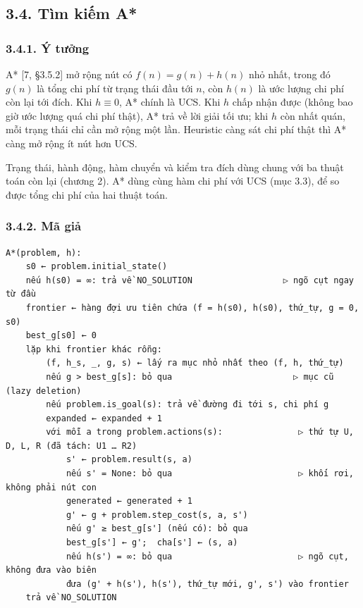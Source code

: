 \subsection{3.4. Tìm kiếm A*}

\subsubsection{3.4.1. Ý tưởng}

A* {[}7, §3.5.2{]} mở rộng nút có \(f(n) = g(n) + h(n)\) nhỏ nhất, trong đó \(g(n)\) là tổng chi phí từ trạng thái đầu tới \(n\), còn \(h(n)\) là ước lượng chi phí còn lại tới đích. Khi \(h \equiv 0\), A* chính là UCS. Khi \(h\) chấp nhận được (không bao giờ ước lượng quá chi phí thật), A* trả về lời giải tối ưu; khi \(h\) còn nhất quán, mỗi trạng thái chỉ cần mở rộng một lần. Heuristic càng sát chi phí thật thì A* càng mở rộng ít nút hơn UCS.

Trạng thái, hành động, hàm chuyển và kiểm tra đích dùng chung với ba thuật toán còn lại (chương 2). A* dùng cùng hàm chi phí với UCS (mục 3.3), để so được tổng chi phí của hai thuật toán.

\subsubsection{3.4.2. Mã giả}

\begin{verbatim}
A*(problem, h):
    s0 ← problem.initial_state()
    nếu h(s0) = ∞: trả về NO_SOLUTION                  ▷ ngõ cụt ngay từ đầu
    frontier ← hàng đợi ưu tiên chứa (f = h(s0), h(s0), thứ_tự, g = 0, s0)
    best_g[s0] ← 0
    lặp khi frontier khác rỗng:
        (f, h_s, _, g, s) ← lấy ra mục nhỏ nhất theo (f, h, thứ_tự)
        nếu g > best_g[s]: bỏ qua                        ▷ mục cũ (lazy deletion)
        nếu problem.is_goal(s): trả về đường đi tới s, chi phí g
        expanded ← expanded + 1
        với mỗi a trong problem.actions(s):               ▷ thứ tự U, D, L, R (đã tách: U1 … R2)
            s' ← problem.result(s, a)
            nếu s' = None: bỏ qua                         ▷ khối rơi, không phải nút con
            generated ← generated + 1
            g' ← g + problem.step_cost(s, a, s')
            nếu g' ≥ best_g[s'] (nếu có): bỏ qua
            best_g[s'] ← g';  cha[s'] ← (s, a)
            nếu h(s') = ∞: bỏ qua                         ▷ ngõ cụt, không đưa vào biên
            đưa (g' + h(s'), h(s'), thứ_tự mới, g', s') vào frontier
    trả về NO_SOLUTION
\end{verbatim}

